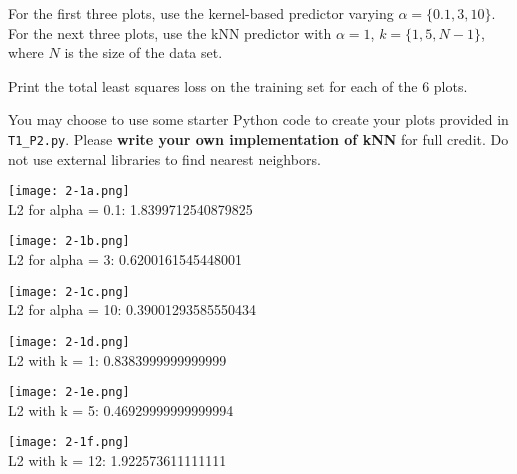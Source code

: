 \documentclass[submit]{harvardml}
\begin{document}
\begin{problem}
\begin{enumerate}
  For the first three plots, use the kernel-based predictor varying
  $\alpha = \{0.1,3,10\}$.  For the next three plots, use the kNN
  predictor with $\alpha = 1$, $k=\{1,5,N-1\}$, where $N$ is the size
  of the data set.

  Print the total least squares loss on the training set for each of
  the 6 plots.
  
  You may choose to use some starter Python code to create your plots
  provided in \verb|T1_P2.py|.  Please \textbf{write your own
    implementation of kNN} for full credit.  Do not use external
  libraries to find nearest neighbors.
      
      \begin{center}
        \texttt{[image: 2-1a.png]}
        \\L2 for alpha = 0.1: 1.8399712540879825
      \end{center}
\end{enumerate}
\end{problem}

\newpage

\begin{framed}
      \begin{center}
        \texttt{[image: 2-1b.png]}      
        \\L2 for alpha = 3: 0.6200161545448001
      \end{center}
      \begin{center}
        \texttt{[image: 2-1c.png]}
        \\L2 for alpha = 10: 0.39001293585550434
      \end{center}
      \begin{center}
        \texttt{[image: 2-1d.png]}
        \\L2 with k = 1: 0.8383999999999999
      \end{center}
      \begin{center}
        \texttt{[image: 2-1e.png]}
        \\L2 with k = 5: 0.46929999999999994
      \end{center}
      \begin{center}
        \texttt{[image: 2-1f.png]}
        \\L2 with k = 12: 1.922573611111111
      \end{center}
\end{framed}
      
\end{document}

